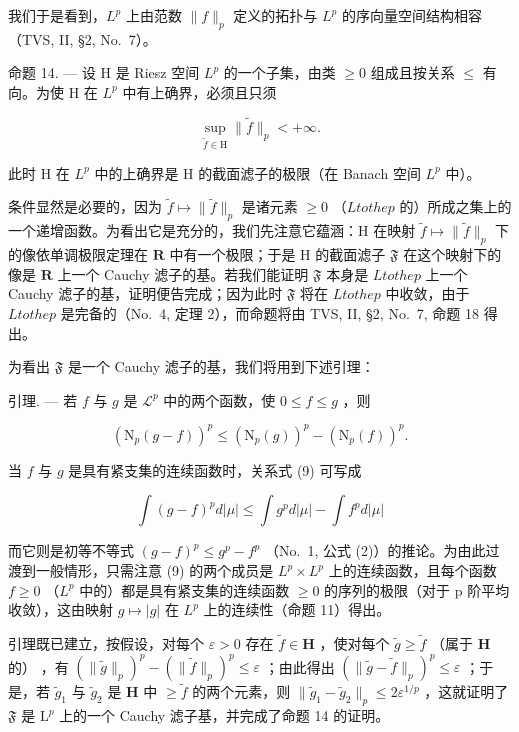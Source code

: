 我们于是看到，\(L^{p}\) 上由范数 \(\|f\|_{p}\) 定义的拓扑与 \(L^{p}\) 的序向量空间结构相容（TVS, II, §2, No.~7）。

命题 14. --- 设 H 是 Riesz 空间 \(L^{p}\) 的一个子集，由类 \(\geqslant 0\) 组成且按关系 \(\leqslant\) 有向。为使 H 在 \(L^{p}\) 中有上确界，必须且只须

\[
\sup _ {\widetilde {f} \in \mathrm{H}} \| \widetilde {f} \| _ {p} <   + \infty .
\]

此时 H 在 \(L^{p}\) 中的上确界是 H 的截面滤子的极限（在 Banach 空间 \(L^{p}\) 中）。

条件显然是必要的，因为 \(\widetilde{f} \mapsto \| \widetilde{f} \|_p\) 是诸元素 \(\geqslant 0\) （\(L to the p\) 的）所成之集上的一个递增函数。为看出它是充分的，我们先注意它蕴涵：H 在映射 \(\widetilde{f} \mapsto \| \widetilde{f} \|_p\) 下的像依单调极限定理在 \(\mathbf{R}\) 中有一个极限；于是 H 的截面滤子 \(\mathfrak{F}\) 在这个映射下的像是 \(\mathbf{R}\) 上一个 Cauchy 滤子的基。若我们能证明 \(\mathfrak{F}\) 本身是 \(L to the p\) 上一个 Cauchy 滤子的基，证明便告完成；因为此时 \(\mathfrak{F}\) 将在 \(L to the p\) 中收敛，由于 \(L to the p\) 是完备的（No.~4, 定理 2），而命题将由 TVS, II, §2, No.~7, 命题 18 得出。

为看出 \(\mathfrak{F}\) 是一个 Cauchy 滤子的基，我们将用到下述引理：

引理. --- 若 \(f\) 与 \(g\) 是 \(\mathcal{L}^p\) 中的两个函数，使 \(0 \leqslant f \leqslant g\) ，则

\[
\left(\mathrm{N} _ {p} (g - f)\right) ^ {p} \leqslant \left(\mathrm{N} _ {p} (g)\right) ^ {p} - \left(\mathrm{N} _ {p} (f)\right) ^ {p}.\tag{9}
\]

当 \(f\) 与 \(g\) 是具有紧支集的连续函数时，关系式 (9) 可写成

\[
\int (g - f) ^ {p} d | \mu | \leqslant \int g ^ {p} d | \mu | - \int f ^ {p} d | \mu |
\]

而它则是初等不等式 \((g - f)^{p} \leqslant g^{p} - f^{p}\) （No.~1, 公式 (2)）的推论。为由此过渡到一般情形，只需注意 (9) 的两个成员是 \(L^{p} \times L^{p}\) 上的连续函数，且每个函数 \(f \geqslant 0\) （\(L^{p}\) 中的）都是具有紧支集的连续函数 \(\geqslant 0\) 的序列的极限（对于 p 阶平均收敛），这由映射 \(g \mapsto |g|\) 在 \(L^{p}\) 上的连续性（命题 11）得出。

引理既已建立，按假设，对每个 \(\varepsilon > 0\) 存在 \(\widetilde{f} \in \mathbf{H}\) ，使对每个 \(\widetilde{g} \geqslant \widetilde{f}\) （属于 \(\mathbf{H}\) 的） ，有 \((\|\widetilde{g}\|_p)^p - (\|\widetilde{f}\|_p)^p \leqslant \varepsilon\) ；由此得出 \((\|\widetilde{g} - \widetilde{f}\|_p)^p \leqslant \varepsilon\) ；于是，若 \(\widetilde{g}_1\) 与 \(\widetilde{g}_2\) 是 \(\mathbf{H}\) 中 \(\geqslant \widetilde{f}\) 的两个元素，则 \(\|\widetilde{g}_1 - \widetilde{g}_2\|_p \leqslant 2\varepsilon^{1/p}\) ，这就证明了 \(\mathfrak{F}\) 是 \(\mathrm{L}^p\) 上的一个 Cauchy 滤子基，并完成了命题 14 的证明。

